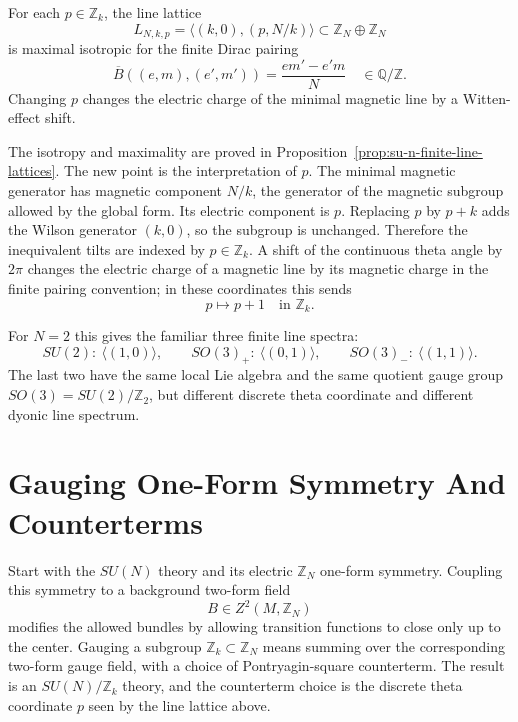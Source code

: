 \begin{remark}
\label{rem:discrete-theta-line-tilt}
For each \(p\in\mathbb Z_k\), the line lattice
\[
  L_{N,k,p}
  =
  \langle (k,0),(p,N/k)\rangle
  \subset\mathbb Z_N\oplus\mathbb Z_N
\]
is maximal isotropic for the finite Dirac pairing
\[
  \overline B((e,m),(e',m'))
  =
  \frac{em'-e'm}{N}
  \quad\in\mathbb Q/\mathbb Z .
\]
Changing \(p\) changes the electric charge of the minimal magnetic line by a
Witten-effect shift.

The isotropy and maximality are proved in
Proposition~\ref{prop:su-n-finite-line-lattices}.  The new point is the
interpretation of \(p\).  The minimal magnetic generator has magnetic
component \(N/k\), the generator of the magnetic subgroup allowed by the
global form.  Its electric component is \(p\).  Replacing \(p\) by \(p+k\)
adds the Wilson generator \((k,0)\), so the subgroup is unchanged.  Therefore
the inequivalent tilts are indexed by \(p\in\mathbb Z_k\).  A shift of the
continuous theta angle by \(2\pi\) changes the electric charge of a magnetic
line by its magnetic charge in the finite pairing convention; in these
coordinates this sends
\[
  p\longmapsto p+1
  \quad\text{in }\mathbb Z_k .
\]
\end{remark}

For \(N=2\) this gives the familiar three finite line spectra:
\[
  SU(2):\ \langle(1,0)\rangle,\qquad
  SO(3)_+:\ \langle(0,1)\rangle,\qquad
  SO(3)_-:\ \langle(1,1)\rangle .
\]
The last two have the same local Lie algebra and the same quotient gauge
group \(SO(3)=SU(2)/\mathbb Z_2\), but different discrete theta coordinate
and different dyonic line spectrum.

\section{Gauging One-Form Symmetry And Counterterms}

Start with the \(SU(N)\) theory and its electric
\(\mathbb Z_N\) one-form symmetry.  Coupling this symmetry to a background
two-form field
\[
  B\in Z^2(M,\mathbb Z_N)
\]
modifies the allowed bundles by allowing transition functions to close only
up to the center.  Gauging a subgroup \(\mathbb Z_k\subset\mathbb Z_N\) means
summing over the corresponding two-form gauge field, with a choice of
Pontryagin-square counterterm.  The result is an
\(SU(N)/\mathbb Z_k\) theory, and the counterterm choice is the discrete theta
coordinate \(p\) seen by the line lattice above.

